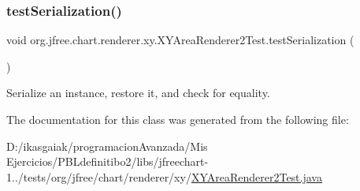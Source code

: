 \subsubsection{\texorpdfstring{test\+Serialization()}{testSerialization()}}
{\footnotesize\ttfamily void org.\+jfree.\+chart.\+renderer.\+xy.\+X\+Y\+Area\+Renderer2\+Test.\+test\+Serialization (\begin{DoxyParamCaption}{ }\end{DoxyParamCaption})}

Serialize an instance, restore it, and check for equality. 

The documentation for this class was generated from the following file\+:\begin{DoxyCompactItemize}
\item 
D\+:/ikasgaiak/programacion\+Avanzada/\+Mis Ejercicios/\+P\+B\+Ldefinitibo2/libs/jfreechart-\/1../tests/org/jfree/chart/renderer/xy/\mbox{\hyperlink{_x_y_area_renderer2_test_8java}{X\+Y\+Area\+Renderer2\+Test.\+java}}\end{DoxyCompactItemize}
